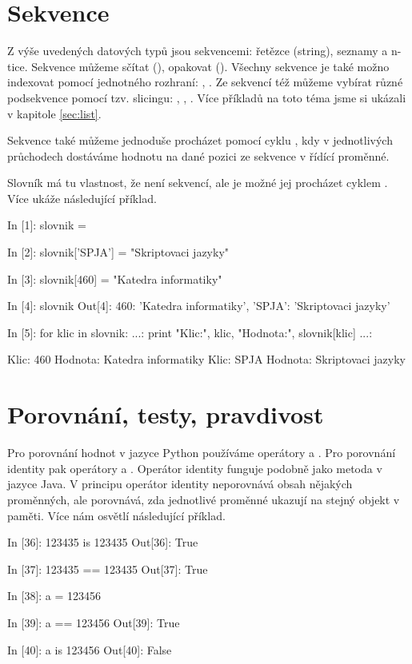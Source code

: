 \section{Sekvence} \label{sec:sequnces}

Z výše uvedených datových typů jsou sekvencemi: řetězce (string), seznamy a n-tice.
Sekvence můžeme sčítat (), opakovat (). Vše\-chny sekvence je také možno indexovat
pomocí jednotného rozhraní: , . Ze sekvencí též můžeme vybírat různé podsekvence pomocí tzv.
slicingu: , , . Více příkladů na toto téma jsme si ukázali v kapitole
\ref{sec:list}.

Sekvence také můžeme jednoduše procházet pomocí cyklu , kdy v jednotlivých průchodech dostáváme hodnotu
na dané pozici ze sekvence v řídící proměnné.

Slovník má tu vlastnost, že není sekvencí, ale je možné jej procházet cyklem . Více ukáže následující příklad.

\begin{python}
In [1]: slovnik = {}

In [2]: slovnik['SPJA'] = "Skriptovaci jazyky"

In [3]: slovnik[460] = "Katedra informatiky"

In [4]: slovnik
Out[4]: {460: 'Katedra informatiky',
         'SPJA': 'Skriptovaci jazyky'}

In [5]: for klic in slovnik:
   ...:     print "Klic:", klic, "Hodnota:", slovnik[klic]
   ...:     

Klic: 460 Hodnota: Katedra informatiky
Klic: SPJA Hodnota: Skriptovaci jazyky
\end{python}

\section{Porovnání, testy, pravdivost}

Pro porovnání hodnot v jazyce Python používáme operátory \kod{==} a \kod{!=}.
Pro porovnání identity pak operátory  a . Operátor identity funguje podobně jako metoda 
v jazyce Java. V principu operátor identity neporovnává obsah nějakých proměnných, ale porovnává, zda jednotlivé
proměnné ukazují na stejný objekt v paměti. Více nám osvětlí následující příklad.

\begin{python}
In [36]: 123435 is 123435
Out[36]: True

In [37]: 123435 == 123435
Out[37]: True

In [38]: a = 123456

In [39]: a == 123456
Out[39]: True

In [40]: a is 123456
Out[40]: False
\end{python}

